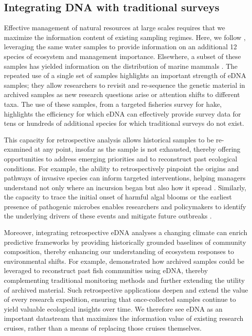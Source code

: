 \documentclass{article}
\begin{document}
\subsection*{Integrating DNA with traditional surveys}
Effective management of natural resources at large scales requires that we maximize the information content of existing sampling regimes. Here, we follow \cite{shelton2022}, leveraging the same water samples to provide information on an additional 12 species of ecosystem and management importance. Elsewhere, a subset of these samples has yielded information on the distribution of marine mammals \cite{valdiviacarrillo2025}. The repeated use of a single set of samples highlights an important strength of eDNA samples; they allow researchers to revisit and re-sequence the genetic material in archived samples as new research questions arise or attention shifts to different taxa. The use of these samples, from a targeted fisheries survey for hake, highlights the efficiency for which eDNA can effectively provide survey data for tens or hundreds of additional species for which traditional surveys do not exist. 

This capacity for retrospective analysis allows historical samples to be re-examined at any point, insofar as the sample is not exhausted, thereby offering opportunities to address emerging priorities and to reconstruct past ecological conditions. For example, the ability to retrospectively pinpoint the origins and pathways of invasive species can inform targeted interventions, helping managers understand not only where an incursion began but also how it spread \cite{gilbey2021}. Similarly, the capacity to trace the initial onset of harmful algal blooms or the earliest presence of pathogenic microbes enables researchers and policymakers to identify the underlying drivers of these events and mitigate future outbreaks \cite{shaw2019}. 

Moreover, integrating retrospective eDNA analyses a changing climate can enrich predictive frameworks by providing historically grounded baselines of community composition, thereby enhancing our understanding of ecosystem responses to environmental shifts. For example, \cite{diaz2020} demonstrated how archived samples could be leveraged to reconstruct past fish communities using eDNA, thereby complementing traditional monitoring methods and further extending the utility of archived material. Such retrospective applications deepen and extend the value of every research expedition, ensuring that once-collected samples continue to yield valuable ecological insights over time. We therefore see eDNA as an important datastream that maximizes the information value of existing research cruises, rather than a means of replacing those cruises themselves.
\end{document}

